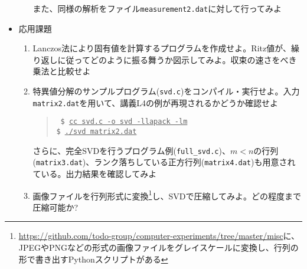 \documentclass[11pt]{jarticle}
\begin{document}
\begin{itemize}
\begin{enumerate}
    また、同様の解析をファイル{\tt measurement2.dat}に対して行ってみよ
  \end{enumerate}  
\item 応用課題
  \begin{enumerate}
  \item Lanczos法により固有値を計算するプログラムを作成せよ。Ritz値が、繰り返しに従ってどのように振る舞うか図示してみよ。収束の速さをべき乗法と比較せよ
  \item 特異値分解のサンプルプログラム({\tt svd.c})をコンパイル・実行せよ。入力{\tt matrix2.dat}を用いて、講義L4の例が再現されるかどうか確認せよ
    \begin{quote} \tt
      \$ \underline{cc svd.c -o svd -llapack -lm} \\
      \$ \underline{./svd matrix2.dat}
    \end{quote}
    さらに、完全SVDを行うプログラム例({\tt full\_svd.c})、$m<n$の行列({\tt matrix3.dat})、ランク落ちしている正方行列({\tt matrix4.dat})も用意されている。出力結果を確認してみよ
  \item 画像ファイルを行列形式に変換\footnote{\url{https://github.com/todo-group/computer-experiments/tree/master/misc}に、JPEGやPNGなどの形式の画像ファイルをグレイスケールに変換し、行列の形で書き出すPythonスクリプトがある}し、SVDで圧縮してみよ。どの程度まで圧縮可能か?
  \end{enumerate}  
\end{itemize}
\end{document}
